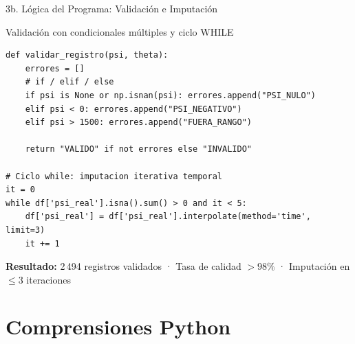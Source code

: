 \documentclass[11pt, aspectratio=169]{beamer}
\begin{document}
\begin{frame}[fragile]{3b. Lógica del Programa: Validación e Imputación}
\begin{block}{Validación con condicionales múltiples y ciclo WHILE}
\begin{lstlisting}[numbers=none,frame=none,basicstyle=\ttfamily\small]
def validar_registro(psi, theta):
    errores = []
    # if / elif / else
    if psi is None or np.isnan(psi): errores.append("PSI_NULO")
    elif psi < 0: errores.append("PSI_NEGATIVO")
    elif psi > 1500: errores.append("FUERA_RANGO")
    
    return "VALIDO" if not errores else "INVALIDO"

# Ciclo while: imputacion iterativa temporal
it = 0
while df['psi_real'].isna().sum() > 0 and it < 5:
    df['psi_real'] = df['psi_real'].interpolate(method='time', limit=3)
    it += 1
\end{lstlisting}
\end{block}

\vfill
\begin{tcolorbox}[colback=SmartOrange!10,colframe=SmartOrange!50,
    arc=4pt,left=6pt,right=6pt,top=4pt,bottom=4pt]
\textbf{Resultado:} 2\,494 registros validados · Tasa de calidad $>98\%$ · Imputación en $\leq 3$ iteraciones
\end{tcolorbox}
\end{frame}

\section{Comprensiones Python}
\end{document}
